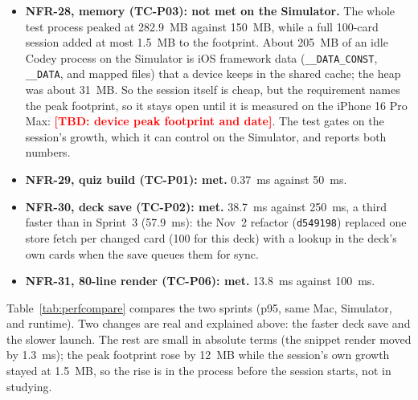 \documentclass[12pt,letterpaper]{article}
\newcommand{\tbd}[1]{\textcolor{red}{\textbf{[TBD: #1]}}}
\begin{document}
\begin{itemize}
        against 5~s, with 50~ms of latency per request; not measured live (S33).
  \item \textbf{NFR-28, memory (TC-P03): not met on the Simulator.} The whole test
        process peaked at 282.9~MB against 150~MB, while a full 100-card session
        added at most 1.5~MB to the footprint. About 205~MB of an idle Codey process on the
        Simulator is iOS framework data (\texttt{\_\_DATA\_CONST}, \texttt{\_\_DATA}, and
        mapped files) that a device keeps in the shared cache; the heap was about
        31~MB. So the session itself is cheap, but the requirement names the peak
        footprint, so it stays open until it is measured on the iPhone 16 Pro Max:
        \tbd{device peak footprint and date}. The test gates on the session's growth, which it can control on the
        Simulator, and reports both numbers.
  \item \textbf{NFR-29, quiz build (TC-P01): met.} 0.37~ms against 50~ms.
  \item \textbf{NFR-30, deck save (TC-P02): met.} 38.7~ms against 250~ms, a third
        faster than in Sprint~3 (57.9~ms): the Nov~2 refactor (\texttt{d549198}) replaced
        one store fetch per changed card (100 for this deck) with a lookup in the
        deck's own cards when the save queues them for sync.
  \item \textbf{NFR-31, 80-line render (TC-P06): met.} 13.8~ms against 100~ms.
\end{itemize}

Table~\ref{tab:perfcompare} compares the two sprints (p95, same Mac, Simulator, and
runtime). Two changes are real and explained above: the faster deck save and the
slower launch. The rest are small in absolute terms (the snippet render moved by
1.3~ms); the peak footprint rose by 12~MB while the session's own growth stayed at
1.5~MB, so the rise is in the process before the session starts, not in studying.
\end{document}
